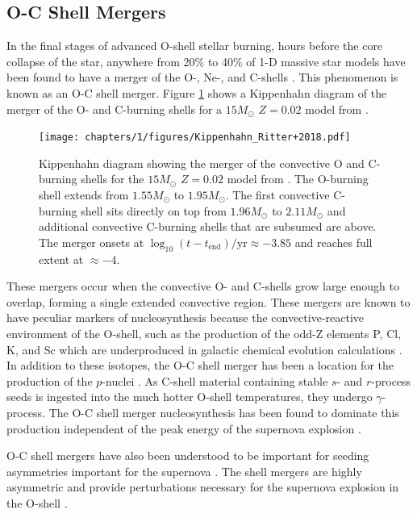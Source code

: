 \subsection{O-C Shell Mergers}

In the final stages of advanced O-shell stellar burning, hours before the core collapse of the star, anywhere from 20\% to 40\% of 1-D massive star models have been found to have a merger of the O-, Ne-, and C-shells \citep{rauscherNucleosynthesisMassiveStars2002, ritterConvectivereactiveNucleosynthesisSc2018, collinsPropertiesConvectiveOxygen2018, robertiGprocessNucleosynthesisCorecollapse2023, robertiOccurrenceImpactCarbonOxygen2025}.
This phenomenon is known as an O-C shell merger.
Figure \ref{fig:kippenhahn_ritter} shows a Kippenhahn diagram of the merger of the O- and C-burning shells for a $15M_\odot$ $Z=0.02$ model from \cite{ritterNuGridStellarData2018}.

\begin{figure}[!htbp]
\texttt{[image: chapters/1/figures/Kippenhahn\_Ritter+2018.pdf]}
\caption{Kippenhahn diagram showing the merger of the convective O and C-burning shells for the $15M_\odot$ $Z=0.02$ model from \cite{ritterNuGridStellarData2018}. The O-burning shell extends from $1.55 M_\odot$ to $1.95 M_\odot$. The first convective C-burning shell sits directly on top from $1.96 M_\odot$ to $2.11 M_\odot$ and additional convective C-burning shells that are subsumed are above. The merger onsets at $\log_{10}(t-t_{\mathrm{end}}) /\mathrm{yr} \approx -3.85$ and reaches full extent at $\approx-4$.
\label{fig:kippenhahn_ritter}}
\end{figure}

These mergers occur when the convective O- and C-shells grow large enough to overlap, forming a single extended convective region.
These mergers are known to have peculiar markers of nucleosynthesis because the convective-reactive environment of the O-shell, such as the production of the odd-Z elements P, Cl, K, and Sc which are underproduced in galactic chemical evolution calculations \citep{ritterConvectivereactiveNucleosynthesisSc2018,robertiOccurrenceImpactCarbonOxygen2025}.
In addition to these isotopes, the O-C shell merger has been a location for the production of the $p$-nuclei \citep{rauscherNucleosynthesisMassiveStars2002, ritterConvectivereactiveNucleosynthesisSc2018, robertiGprocessNucleosynthesisCorecollapse2023}.
As C-shell material containing stable $s$- and $r$-process seeds is ingested into the much hotter O-shell temperatures, they undergo $\gamma$-process.
The O-C shell merger nucleosynthesis has been found to dominate this production independent of the peak energy of the supernova explosion \citep{robertiGprocessNucleosynthesisCorecollapse2024b}. 

O-C shell mergers have also been understood to be important for seeding asymmetries important for the supernova \citep{mullerStatusMultiDimensionalCoreCollapse2016, collinsPropertiesConvectiveOxygen2018, mullerHydrodynamicsCorecollapseSupernovae2020, yadavLargescaleMixingViolent2020a, andrassy3DHydrodynamicSimulations2020}.
The shell mergers are highly asymmetric and provide perturbations necessary for the supernova explosion in the O-shell \citep{collinsPropertiesConvectiveOxygen2018}.